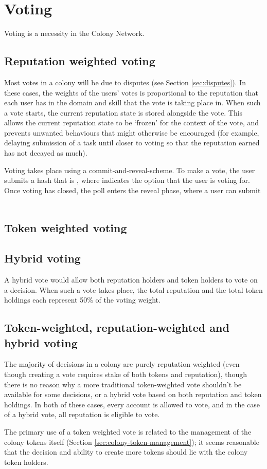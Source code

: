 \section{Voting}
Voting is a necessity in the Colony Network. 

\subsection{Reputation weighted voting}
Most votes in a colony will be due to disputes (see Section \ref{sec:disputes}). In these cases, the weights of the users' votes is proportional to the reputation that each user has in the domain and skill that the vote is taking place in. When such a vote starts, the current reputation state is stored alongside the vote. This allows the current reputation state to be `frozen' for the context of the vote, and prevents unwanted behaviours that might otherwise be encouraged (for example, delaying submission of a task until closer to voting so that the reputation earned has not decayed as much).

Voting takes place using a commit-and-reveal-scheme. To make a vote, the user submits a hash that is , where  indicates the option that the user is voting for. Once voting has closed, the poll enters the reveal phase, where a user can submit \



\subsection{Token weighted voting}

\subsection{Hybrid voting}
A hybrid vote would allow both reputation holders and token holders to vote on a decision. When such a vote takes place, the total reputation and the total token holdings each represent 50\% of the voting weight.

\subsection{Token-weighted, reputation-weighted and hybrid voting}
The majority of decisions in a colony are purely reputation weighted (even though creating a vote requires stake of both tokens and reputation), though there is no reason why a more traditional token-weighted vote shouldn't be available for some decisions, or a hybrid vote based on both reputation and token holdings. In both of these cases, every account is allowed to vote, and in the case of a hybrid vote, all reputation is eligible to vote.

The primary use of a token weighted vote is related to the management of the colony tokens itself (Section \ref{sec:colony-token-management}); it seems reasonable that the decision and ability to create more tokens should lie with the colony token holders.